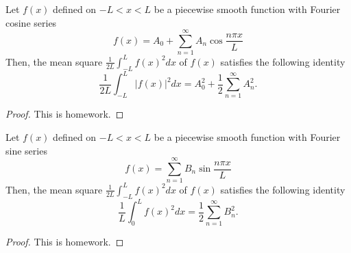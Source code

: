 \begin{theorem} Let $f(x)$ defined on $-L<x<L$ be a piecewise smooth function with Fourier cosine series 
    \begin{equation}\label{eq.Parseval_cosine_assumption}
        f(x)=A_0 + \sum_{n=1}^{\infty} A_n \cos \frac{n \pi x}{L}
    \end{equation}
    Then, the mean square $\frac{1}{2 L} \int_{-L}^L f(x)^2 d x$ of $f(x)$ satisfies the following identity
    \begin{equation}\label{eq.Parseval_cosine}
        \frac{1}{2 L} \int_{-L}^L |f(x)|^2 d x=A_0^2 + \frac{1}{2}\sum_{n=1}^{\infty}A_n^2 .
    \end{equation}
\end{theorem}
\begin{proof}
    This is homework.
\end{proof}

\begin{theorem}
    Let $f(x)$ defined on $-L<x<L$ be a piecewise smooth function with Fourier sine series 
    \begin{equation}\label{eq.Parseval_sine_assumption}
        f(x)=\sum_{n=1}^{\infty} B_n \sin \frac{n \pi x}{L}
    \end{equation}
    Then, the mean square $\frac{1}{2 L} \int_{-L}^L f(x)^2 d x$ of $f(x)$ satisfies the following identity
    \begin{equation}\label{eq.Parseval_sine}
        \frac{1}{L} \int_{0}^L f(x)^2 d x=\frac{1}{2}\sum_{n=1}^{\infty} B_n^2 .
    \end{equation}
\end{theorem}
\begin{proof}
    This is homework.
\end{proof}
